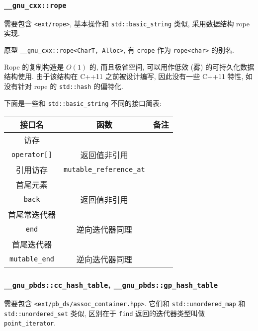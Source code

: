 \subsubsection{\lstinline[basicstyle=\mono]{__gnu_cxx::rope}}
需要包含 \lstinline{<ext/rope>}, 基本操作和 \lstinline{std::basic_string} 类似, 采用数据结构 rope 实现.

原型 \lstinline{__gnu_cxx::rope<CharT, Alloc>}, 有 \lstinline{crope} 作为 \lstinline{rope<char>} 的别名.

Rope 的复制构造是 $O(1)$ 的, 而且极省空间, 可以用作低效 (雾) 的可持久化数据结构使用.  由于该结构在 C++11 之前被设计编写, 因此没有一些 C++11 特性, 如没有针对 rope 的 \lstinline{std::hash} 的偏特化.

下面是一些和 \lstinline{std::basic_string} 不同的接口简表:

\begin{center}
  \begin{tabular}{ccc}
    \toprule
    \textbf{接口名} & \textbf{函数} & \textbf{备注} \\
    \toprule
    访存 & \makecell{\lstinline|at|\\\lstinline|operator[]|} & 返回值非引用 \\
    \midrule
    引用访存 & \lstinline|mutable_reference_at| & \\
    \midrule
    首尾元素 & \makecell{\lstinline|front|\\\lstinline|back|} & 返回值非引用 \\
    \midrule
    首尾常迭代器 & \makecell{\lstinline|begin|\\\lstinline|end|} & 逆向迭代器同理 \\
    \midrule
    首尾迭代器 & \makecell{\lstinline|mutable_begin|\\\lstinline|mutable_end|} & 逆向迭代器同理 \\
    \bottomrule
  \end{tabular}
\end{center}

\subsubsection{\lstinline[basicstyle=\mono]{__gnu_pbds::cc_hash_table}, \lstinline[basicstyle=\mono]{__gnu_pbds::gp_hash_table}}

需要包含 \lstinline{<ext/pb_ds/assoc_container.hpp>}. 它们和 \lstinline{std::unordered_map} 和 \lstinline{std::unordered_set} 类似, 区别在于 \lstinline{find} 返回的迭代器类型叫做 \lstinline{point_iterator}.

